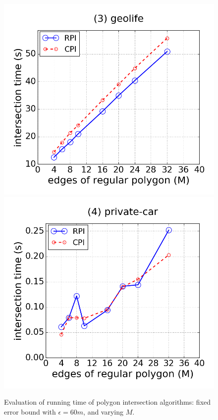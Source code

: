 \begin{figure}[tb!]
\includegraphics[scale = 0.250]{figures/Exp-M-poly-time-geolife.png}
\includegraphics[scale = 0.250]{figures/Exp-M-poly-time-private.png}
\vspace{-2ex}
\caption{\small Evaluation of running time of polygon intersection algorithms: fixed error bound with $\epsilon=60m$, and varying $M$.}
\label{fig:m-poly-time}
\vspace{-1ex}
\end{figure}

